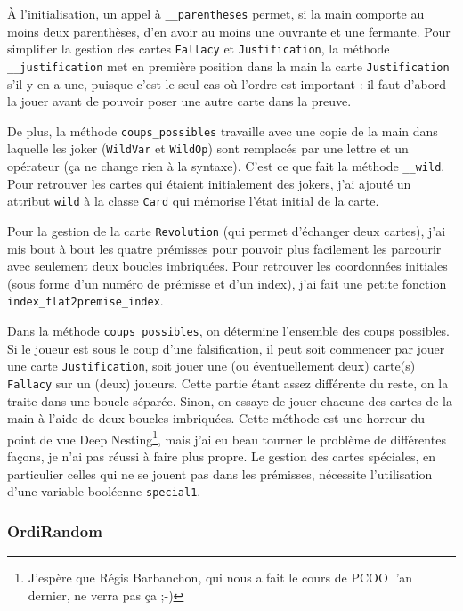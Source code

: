\documentclass[12pt, a4paper]{article}
\begin{document}
À l'initialisation, un appel à \texttt{\_\_parentheses} permet, si la main comporte au moins deux parenthèses, d'en avoir au moins une ouvrante et une fermante. Pour simplifier la gestion des cartes \texttt{Fallacy} et \texttt{Justification}, la méthode \texttt{\_\_justification} met en première position dans la main la carte \texttt{Justification} s'il y en a une, puisque c'est le seul cas où l'ordre est important : il faut d'abord la jouer avant de pouvoir poser une autre carte dans la preuve.

De plus, la méthode \texttt{coups\_possibles} travaille avec une copie de la main dans laquelle les joker (\texttt{WildVar} et \texttt{WildOp}) sont remplacés par une lettre et un opérateur (ça ne change rien à la syntaxe). C'est ce que fait la méthode \texttt{\_\_wild}. Pour retrouver les cartes qui étaient initialement des jokers, j'ai ajouté un attribut \texttt{wild} à la classe \texttt{Card} qui mémorise l'état initial de la carte.

Pour la gestion de la carte \texttt{Revolution} (qui permet d'échanger deux cartes), j'ai mis bout à bout les quatre prémisses pour pouvoir plus facilement les parcourir avec seulement deux boucles imbriquées. Pour retrouver les coordonnées initiales (sous forme d'un numéro de prémisse et d'un index), j'ai fait une petite fonction \texttt{index\_flat2premise\_index}.


Dans la méthode \texttt{coups\_possibles}, on détermine l'ensemble des coups possibles. Si le joueur est sous le coup d'une falsification, il peut soit commencer par jouer une carte \texttt{Justification}, soit jouer une (ou éventuellement deux) carte(s) \texttt{Fallacy} sur un (deux) joueurs. Cette partie étant assez différente du reste, on la traite dans une boucle séparée. Sinon, on essaye de jouer chacune des cartes de la main à l'aide de deux boucles imbriquées. Cette méthode est une horreur du point de vue Deep Nesting\footnote{J'espère que Régis Barbanchon, qui nous a fait le cours de PCOO l'an dernier, ne verra pas ça ;-)}, mais j'ai eu beau tourner le problème de différentes façons, je n'ai pas réussi à faire plus propre.  Le gestion des cartes spéciales, en particulier celles qui ne se jouent pas dans les prémisses, nécessite l'utilisation d'une variable booléenne \texttt{special1}. 


\subsubsection{OrdiRandom}
\end{document}
